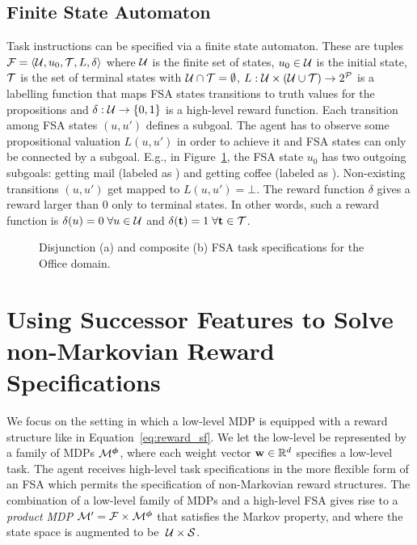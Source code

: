 \subsection{Finite State Automaton} Task instructions can be specified via a finite state automaton. These are tuples ${\mathcal{F}=\langle \mathcal{U},u_0,\mathcal{T},L,\delta\rangle}$ where $\mathcal{U}$ is the finite set of states, $u_0\in\mathcal{U}$ is the initial state, $\mathcal{T}$ is the set of terminal states with $\mathcal{U}\cap\mathcal{T}=\emptyset$, $L:\mathcal{U}\times(\mathcal{U}\cup\mathcal{T})\rightarrow 2^{\mathcal{P}}$ is a labelling function that maps FSA states transitions to truth values for the propositions and $\delta:\mathcal{U}\rightarrow \{0, 1\}$ is a high-level reward function. Each transition among FSA states $(u, u')$ defines a subgoal. The agent has to observe some propositional valuation $L(u, u')$ in order to achieve it and FSA states can only be connected by a subgoal. E.g., in Figure~\ref{fig:office_fsa_disjunction}, the FSA state $u_0$ has two outgoing subgoals: getting mail (labeled as \mail) and getting coffee (labeled as \coffee). Non-existing transitions $(u, u')$ get mapped to $L(u, u')=\bot$. The reward function $\delta$ gives a reward larger than 0 only to terminal states. In other words, such a reward function is $\delta(u)=0\;\forall u\in\mathcal{U}$ and $\delta(\mathbf{t})=1\;\forall \mathbf{t}\in\mathcal{T}$. 

\begin{figure}[!hbt]
  \centering
  \begin{subfigure}[h]{0.23\textwidth}
    \centering
    
    \caption{}
    \label{fig:office_fsa_disjunction}
  \end{subfigure}
  \hfill 
  \begin{subfigure}[h]{0.23\textwidth}
    \centering
    
    \caption{}
    \label{fig:office_fsa_composite}
  \end{subfigure}
  \caption{Disjunction (a) and composite (b) FSA task specifications for the Office domain.}
 \label{fig:sample_fsas}
\end{figure} 

\section{Using Successor Features to Solve non-Markovian Reward Specifications}

We focus on the setting in which a low-level MDP is equipped with a reward structure like in Equation~\eqref{eq:reward_sf}. We let the low-level be represented by a family of MDPs $\mathcal{M}^{\boldsymbol{\phi}}$, where each weight vector $\mathbf{w}\in\mathbb{R}^d$ specifies a low-level task. The agent receives high-level task specifications in the more flexible form of an FSA which permits the specification of non-Markovian reward structures. The combination of a low-level family of MDPs and a high-level FSA gives rise to a \textit{product MDP} $\mathcal{M}'=\mathcal{F}\times\mathcal{M}^{\boldsymbol{\phi}}$ that satisfies the Markov property, and where the state space is augmented to be $\;\mathcal{U}\times\mathcal{S}$.


